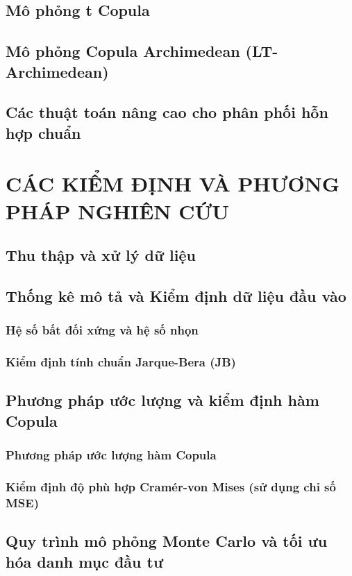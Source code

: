 \documentclass[a4paper,12pt]{article}
\begin{document}
\subsection{Mô phỏng t Copula}

\subsection{Mô phỏng Copula Archimedean (LT-Archimedean)}

\subsection{Các thuật toán nâng cao cho phân phối hỗn hợp chuẩn}

\section{CÁC KIỂM ĐỊNH VÀ PHƯƠNG PHÁP NGHIÊN CỨU}
\subsection{Thu thập và xử lý dữ liệu}

\subsection{Thống kê mô tả và Kiểm định dữ liệu đầu vào}
\subsubsection{Hệ số bất đối xứng và hệ số nhọn}

\subsubsection{Kiểm định tính chuẩn Jarque-Bera (JB)}

\subsection{Phương pháp ước lượng và kiểm định hàm Copula}
\subsubsection{Phương pháp ước lượng hàm Copula}

\subsubsection{Kiểm định độ phù hợp Cramér-von Mises (sử dụng chỉ số MSE)}

\subsection{Quy trình mô phỏng Monte Carlo và tối ưu hóa danh mục đầu tư}
\end{document}

